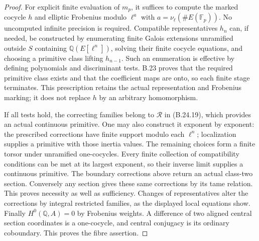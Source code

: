 \begin{proof}
For explicit finite evaluation of $m_p$, it suffices
to compute the marked cocycle $h$ and elliptic
Frobenius modulo $\ell^a$ with
$a=\nu_\ell(\#E(\mathbb F_p))$.
No uncomputed infinite precision is required.
Compatible representatives $h_n$ can, if needed,
be constructed by enumerating finite Galois
extensions unramified outside $S$ containing
$\mathbb Q(E[\ell^n])$, solving their finite cocycle
equations, and choosing a primitive class lifting
$h_{n-1}$. Such an enumeration is effective by
defining polynomials and discriminant tests.
B.23 proves that the required primitive class
exists and that the coefficient maps are onto,
so each finite stage terminates.
This prescription retains the actual representation
and Frobenius marking; it does not replace $h$
by an arbitrary homomorphism.

If all tests hold, the correcting families belong
to $\mathcal R$ in (B.24.19), which provides an
actual continuous primitive. One may also construct
it exponent by exponent: the prescribed corrections
have finite support modulo each $\ell^n$;
localization supplies a primitive with those
inertia values. The remaining choices form a finite
torsor under unramified one-cocycles.
Every finite collection of compatibility conditions
can be met at its largest exponent, so their
inverse limit supplies a continuous primitive.
The boundary corrections above return an actual
class-two section. Conversely any section gives
these same corrections by its tame relation.
This proves necessity as well as sufficiency.
Changes of representatives alter the corrections
by integral restricted families, as the displayed
local equations show. Finally $H^0(\mathbb Q,A)=0$
by Frobenius weights. A difference of two aligned
central section coordinates is a one-cocycle,
and central conjugacy is its ordinary coboundary.
This proves the fibre assertion.
\end{proof}

